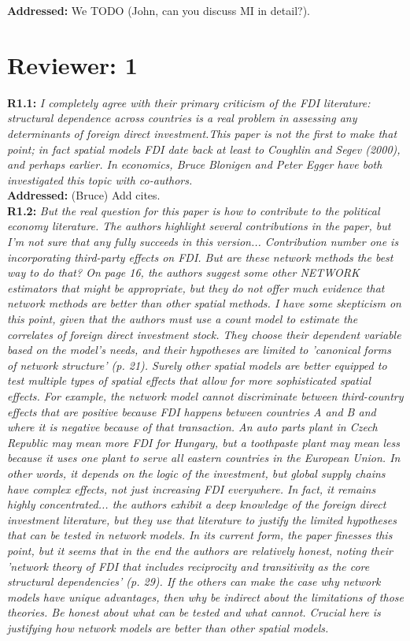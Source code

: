 \documentclass[a4paper,11pt]{texMemo}
\begin{document}
\noindent \textbf{Addressed:} We TODO (John, can you discuss MI in detail?). \\


\section*{Reviewer: 1}

\textbf{R1.1:} \emph{I completely agree with their primary criticism of the FDI literature: structural dependence across countries is a real problem in assessing any determinants of foreign direct investment.This paper is not the first to make that point; in fact spatial models FDI date back at least to Coughlin and Segev (2000), and perhaps earlier. In economics, Bruce Blonigen and Peter Egger have both investigated this topic with co-authors.}  \\

\noindent \textbf{Addressed:}   (Bruce) Add cites. \\

\textbf{R1.2:} \emph{But the real question for this paper is how to contribute to the political economy literature. The authors highlight several contributions in the paper, but I'm not sure that any fully succeeds in this version... Contribution number one is incorporating third-party effects on FDI. But are these network methods the best way to do that? On page 16, the authors suggest some other NETWORK estimators that might be appropriate, but they do not offer much evidence that network methods are better than other spatial methods. I have some skepticism on this point, given that the authors must use a count model to estimate the correlates of foreign direct investment stock. They choose their dependent variable based on the model's needs, and their hypotheses are limited to 'canonical forms of network structure' (p. 21). Surely other spatial models are better equipped to test multiple types of spatial effects that allow for more sophisticated spatial effects. For example, the network model cannot discriminate between third-country effects that are positive because FDI happens between countries A and B and where it is negative because of that transaction. An auto parts plant in Czech Republic may mean more FDI for Hungary, but a toothpaste plant may mean less because it uses one plant to serve all eastern countries in the European Union. In other words, it depends on the logic of the investment, but global supply chains have complex effects, not just increasing FDI everywhere. In fact, it remains highly concentrated... the authors exhibit a deep knowledge of the foreign direct investment literature, but they use that literature to justify the limited hypotheses that can be tested in network models. In its current form, the paper finesses this point, but it seems that in the end the authors are relatively honest, noting their 'network theory of FDI that includes reciprocity and transitivity as the core structural dependencies' (p. 29). If the others can make the case why network models have unique advantages, then why be indirect about the limitations of those theories. Be honest about what can be tested and what cannot. Crucial here is justifying how network models are better than other spatial models.}\\
\end{document}
